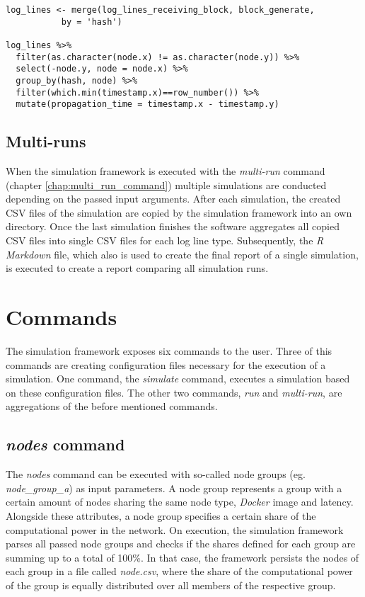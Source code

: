 \begin{minipage}{\linewidth}
\begin{lstlisting}[caption=Calculation of propagation time with \textit{R}, label={lst:propagation_time}, basicstyle=\ttfamily, captionpos=b]
log_lines <- merge(log_lines_receiving_block, block_generate,
		   by = 'hash')

log_lines %>%
  filter(as.character(node.x) != as.character(node.y)) %>%
  select(-node.y, node = node.x) %>%
  group_by(hash, node) %>%
  filter(which.min(timestamp.x)==row_number()) %>%
  mutate(propagation_time = timestamp.x - timestamp.y)
\end{lstlisting}
\end{minipage}
 
\subsection{Multi-runs}

When the simulation framework is executed with the \textit{multi-run} command (chapter \ref{chap:multi_run_command}) multiple simulations are conducted depending on the passed input arguments.
After each simulation, the created CSV files of the simulation are copied by the simulation framework into an own directory.
Once the last simulation finishes the software aggregates all copied CSV files into single CSV files for each log line type.
Subsequently, the \textit{R Markdown} file, which also is used to create the final report of a single  simulation, is executed to create a report comparing all simulation runs.
 
\section{Commands}
\label{chap:commands}

The simulation framework exposes six commands to the user.
Three of this commands are creating configuration files necessary for the execution of a simulation. One command, the \textit{simulate} command, executes a simulation based on these configuration files.
The other two commands, \textit{run} and \textit{multi-run}, are aggregations of the before mentioned commands.

\subsection{\textit{nodes} command} \label{chap:nodes_command}

The \textit{nodes} command can be executed with so-called node groups (eg. \textit{node\_group\_a}) as input parameters.
A node group represents a group with a certain amount of nodes sharing the same node type, \textit{Docker} image and latency.
Alongside these attributes, a node group specifies a certain share of the computational power in the network.
On execution, the simulation framework parses all passed node groups and checks if the shares defined for each group are summing up to a total of 100\%.
In that case, the framework persists the nodes of each group in a file called \textit{node.csv}, where the share of the computational power of the group is equally distributed over all members of the respective group.

